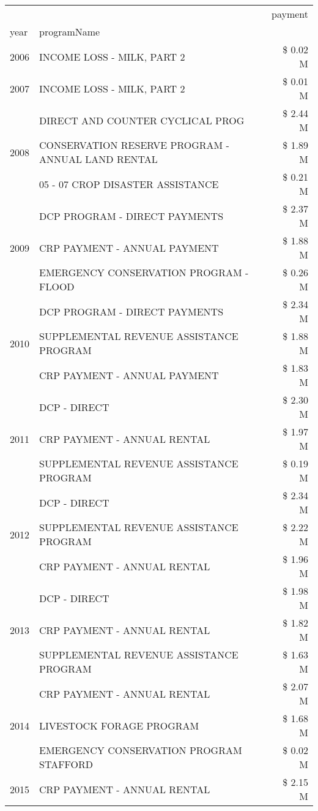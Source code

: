 \begin{tabular}{llr}
\toprule
 &  & payment \\
year & programName &  \\
\midrule
2006 & INCOME LOSS - MILK, PART 2 & \$ 0.02 M \\
\cline{1-3}
2007 & INCOME LOSS - MILK, PART 2 & \$ 0.01 M \\
\cline{1-3}
\multirow[t]{3}{*}{2008} & DIRECT AND COUNTER CYCLICAL PROG & \$ 2.44 M \\
 & CONSERVATION RESERVE PROGRAM - ANNUAL LAND RENTAL & \$ 1.89 M \\
 & 05 - 07 CROP DISASTER ASSISTANCE & \$ 0.21 M \\
\cline{1-3}
\multirow[t]{3}{*}{2009} & DCP PROGRAM - DIRECT PAYMENTS & \$ 2.37 M \\
 & CRP PAYMENT - ANNUAL PAYMENT & \$ 1.88 M \\
 & EMERGENCY CONSERVATION PROGRAM - FLOOD & \$ 0.26 M \\
\cline{1-3}
\multirow[t]{3}{*}{2010} & DCP PROGRAM - DIRECT PAYMENTS & \$ 2.34 M \\
 & SUPPLEMENTAL REVENUE ASSISTANCE PROGRAM & \$ 1.88 M \\
 & CRP PAYMENT - ANNUAL PAYMENT & \$ 1.83 M \\
\cline{1-3}
\multirow[t]{3}{*}{2011} & DCP - DIRECT & \$ 2.30 M \\
 & CRP PAYMENT - ANNUAL RENTAL & \$ 1.97 M \\
 & SUPPLEMENTAL REVENUE ASSISTANCE PROGRAM & \$ 0.19 M \\
\cline{1-3}
\multirow[t]{3}{*}{2012} & DCP - DIRECT & \$ 2.34 M \\
 & SUPPLEMENTAL REVENUE ASSISTANCE PROGRAM & \$ 2.22 M \\
 & CRP PAYMENT - ANNUAL RENTAL & \$ 1.96 M \\
\cline{1-3}
\multirow[t]{3}{*}{2013} & DCP - DIRECT & \$ 1.98 M \\
 & CRP PAYMENT - ANNUAL RENTAL & \$ 1.82 M \\
 & SUPPLEMENTAL REVENUE ASSISTANCE PROGRAM & \$ 1.63 M \\
\cline{1-3}
\multirow[t]{3}{*}{2014} & CRP PAYMENT - ANNUAL RENTAL & \$ 2.07 M \\
 & LIVESTOCK FORAGE PROGRAM & \$ 1.68 M \\
 & EMERGENCY CONSERVATION PROGRAM STAFFORD & \$ 0.02 M \\
\cline{1-3}
\multirow[t]{3}{*}{2015} & CRP PAYMENT - ANNUAL RENTAL & \$ 2.15 M \\

\end{tabular}
